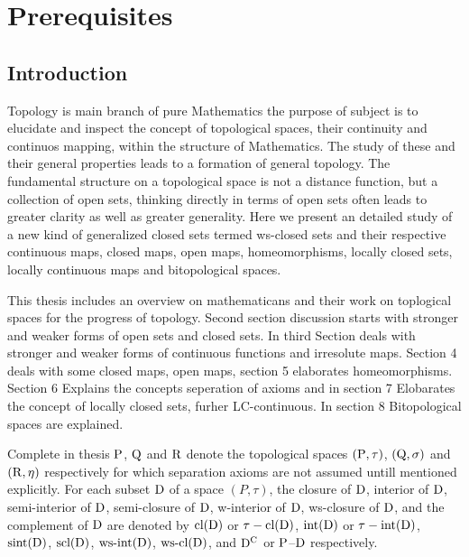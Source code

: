 \chapter{Prerequisites}
\graphicspath{{Chapter1/Chapter1Figs/EPS/}{Chapter1/Chapter1Figs/}}

\section{Introduction}

Topology is main branch of pure Mathematics the purpose of subject is to elucidate and inspect the concept of topological spaces, their continuity and continuos mapping, within the structure of Mathematics. The study of these and their general properties leads to a formation of general topology. The fundamental structure on a topological space is not a distance function, but a collection of open sets, thinking directly in terms of open sets often leads to greater clarity as well as greater generality. Here we present an detailed study of a new kind of generalized closed sets termed ws-closed sets and their respective continuous maps, closed maps, open maps, homeomorphisms, locally closed sets, locally continuous maps and bitopological spaces.

This thesis includes an overview on mathematicans and their work on toplogical spaces for the progress of topology. Second section discussion starts with stronger and weaker forms of open sets and closed sets. In third Section deals with stronger and weaker forms of continuous functions and irresolute maps. Section 4 deals with some closed maps, open maps, section 5 elaborates homeomorphisms. Section 6 Explains the concepts seperation of axioms and in section 7 Elobarates the concept of locally closed sets, furher LC-continuous. In section 8 Bitopological spaces are explained.

Complete in thesis $\mathrm{P}$, $\mathrm{Q}$ and $\mathrm{R}$ denote the topological spaces $(\mathrm{P},\tau)$, $(\mathrm{Q},\sigma)$ and $(\mathrm{R}, \eta)$ respectively for which separation axioms are not assumed untill mentioned explicitly. For each subset $\mathrm{D}$ of a space $(P, \tau)$, the closure of $\mathrm{D}$, interior of $\mathrm{D}$, semi-interior of $\mathrm{D}$, semi-closure of $\mathrm{D}$, w-interior of $\mathrm{D}$, ws-closure of $\mathrm{D}$, and the complement of $\mathrm{D}$ are denoted by $\mbox{cl}(\mathrm{D})$ or $\tau-\mbox{cl}(\mathrm{D})$, $\mbox{int}(\mathrm{D})$ or $\tau-\mbox{int}(\mathrm{D})$, $\mbox{sint}(\mathrm{D})$, $\mbox{scl}(\mathrm{D})$, $\mbox{ws-int}(\mathrm{D})$, $\mbox{ws-cl}(\mathrm{D})$, and $\mathrm{D}^{\text{C}}$ or $\mathrm{P}$--$\mathrm{D}$ respectively.


